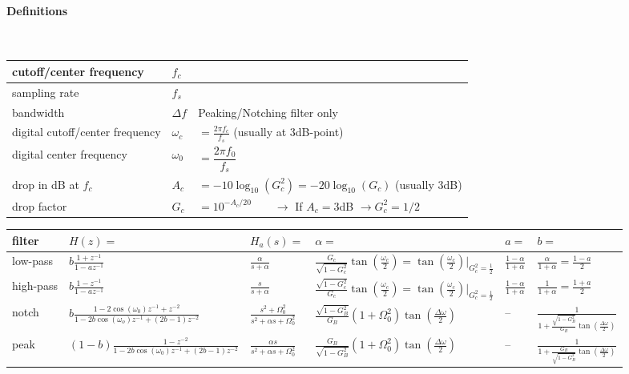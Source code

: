 \paragraph{Definitions}~\\
\begin{tabular}{|l|l|l|}
	\hline
	cutoff/center frequency & $f_c$ &
	\\ \hline
	sampling rate & $f_s$ &
	\\ \hline
	bandwidth & $\Delta f$ & Peaking/Notching filter only
	\\ \hline
	digital cutoff/center frequency & $\omega_c$ & $ = \frac{2\pi f_c}{f_s}$ \qquad (usually at 3dB-point)
	\\ \hline
	digital center frequency & $\omega_0$ & $=\dfrac{2\pi f_0}{f_s}$
	\\ \hline
	drop in dB at $f_c$ & $A_c$ & $= -10\log_{10}(G_c^2) = -20\log_{10}(G_c)$ \qquad (usually 3dB)
	\\ \hline
	drop factor & $G_c$ & $=10^{-A_c/20} \qquad \longrightarrow $ If $A_c = 3$dB $\rightarrow G_c^2 = 1/2$
	\\ \hline
\end{tabular}
\vfill
\begin{tabularx}{\textwidth}{|X|l|l|l|l|l|}
	\hline
	\textbf{filter} & $H(z) = $ & $H_a(s) = $ & $\alpha = $ & $a=$ & $b=$
	\\ \hline
	low-pass	&
	$b\frac{1 + z^{-1}}{1 - a z^{-1}}$ &
	$\frac{\alpha}{s + \alpha}$	&
	$ \frac{G_c}{\sqrt{1-G_c^2}}\tan\left(\frac{\omega_c}{2}\right)
	= \tan\left(\frac{\omega_c}{2}\right)\vert_{G_c^2 = \frac{1}{2}}$&
	$\frac{1 - \alpha}{1 + \alpha}$ &
	$\frac{\alpha}{1 + \alpha} = \frac{1 - a}{2}$
	\\ \hline
	high-pass &
	$b\frac{1 - z^{-1}}{1 - a z^{-1}}$ &
	$\frac{s}{s + \alpha}$ &
	$\frac{\sqrt{1-G_c^2}}{G_c}\tan\left(\frac{\omega_c}{2}\right)
	=\tan\left(\frac{\omega_c}{2}\right)\vert_{G_c^2 = \frac{1}{2}}$&
	$\frac{1-\alpha}{1+\alpha}$&
	$\frac{1}{1+\alpha} = \frac{1 + a}{2}$
	\\ \hline
	notch &
	$b\frac{1-2\cos(\omega_0) z^{-1} + z^{-2}}{1 -2b \cos(\omega_o) z^{-1} + (2b-1)z^{-2}}$&
	$\frac{s^2 + \Omega_0^2}{s^2+\alpha s + \Omega_0^2}$&
	$\frac{\sqrt{1-G_B^2}}{G_B}(1+\Omega_0^2)\tan\left(\frac{\Delta\omega}{2}\right)$&
	--&
	$\frac{1}{1+\frac{\sqrt{1-G_B^2}}{G_B}\tan\left(\frac{\Delta\omega}{2}\right)}$
	\\ \hline
	peak &
	$(1-b)\frac{1-z^{-2}}{1-2b\cos(\omega_0)z^{-1} + (2b-1)z^{-2}}$&
	$\frac{\alpha s}{s^2 + \alpha s + \Omega_0^2}$&
	$\frac{G_B}{\sqrt{1-G_B^2}}(1+\Omega_0^2)\tan\left(\frac{\Delta\omega}{2}\right)$&
	--&
	$\frac{1}{1+\frac{G_B}{\sqrt{1-G_B^2}}\tan\left(\frac{\Delta\omega}{2}\right)}$
	\\ \hline
\end{tabularx}



